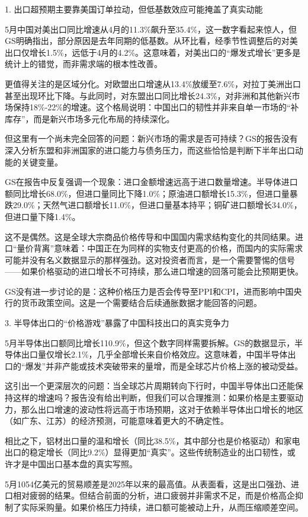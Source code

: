 \documentclass[11pt]{ctexart}
\begin{document}
1. 出口超预期主要靠美国订单拉动，但低基数效应可能掩盖了真实动能

5月中国对美出口同比增速从4月的11.3\%飙升至35.4\%，这一数字看起来惊人，但GS明确指出，部分原因是去年同期的低基数。从环比看，经季节性调整后的对美出口仅增长1.5\%，远低于4月的4.2\%。这意味着，对美出口的“爆发式增长”更多是统计上的错觉，而非需求端的根本性改善。

更值得关注的是区域分化。对欧盟出口增速从13.4\%放缓至7.6\%，对拉丁美洲出口甚至出现环比下降。与此同时，对东盟出口同比增长24.3\%，对非洲和其他新兴市场保持18\%-22\%的增速。这个格局说明：中国出口的韧性并非来自单一市场的“补库存”，而是新兴市场多元化布局的持续深化。

但这里有一个尚未完全回答的问题：新兴市场的需求是否可持续？GS的报告没有深入分析东盟和非洲国家的进口能力与债务压力，而这些恰恰是判断下半年出口动能的关键变量。

GS在报告中反复强调一个现象：进口金额增速远高于进口数量增速。半导体进口额同比增长68.0\%，但进口量同比下降1.0\%；原油进口额增长15.3\%，但进口量暴跌29.0\%；天然气进口额增长11.0\%，但进口量基本持平；铜矿进口额增长34.0\%，但进口量下降1.4\%。

这不是偶然。这是全球大宗商品价格传导和中国国内需求结构变化的共同结果。进口“量价背离”意味着：中国正在为同样的实物支付更高的价格，而国内的实际需求可能并没有名义数据显示的那样强劲。这对投资者而言，是一个需要警惕的信号——如果价格驱动的进口增长不可持续，那么进口增速的回落可能会比预期更快。

GS没有进一步讨论的是：这种价格压力是否会传导至PPI和CPI，进而影响中国央行的货币政策空间。这是一个需要结合后续通胀数据才能回答的问题。

3. 半导体出口的“价格游戏”暴露了中国科技出口的真实竞争力

5月半导体出口额同比增长110.9\%，但这个数字同样需要拆解。GS的数据显示，半导体出口量仅增长2.1\%，几乎全部增长来自价格效应。这意味着，中国半导体出口的“爆发”并非产能或技术突破带来的量增，而是全球芯片价格上涨的被动受益。

这引出一个更深层次的问题：当全球芯片周期转向下行时，中国半导体出口还能保持这样的增速吗？报告没有给出判断，但我们可以合理推测：如果价格是主要驱动力，那么出口增速的波动性将远高于市场预期，这对于依赖半导体出口增长的地区（如广东、江苏）的经济预测，可能意味着更大的不确定性。

相比之下，铝材出口量的温和增长（同比38.5\%，其中部分也是价格驱动）和家电出口的稳定增长（同比9.2\%）显得更加“真实”。这些传统制造业的出口韧性，或许才是中国出口基本盘的真实写照。

5月1054亿美元的贸易顺差是2025年以来的最高值。从表面看，这是出口强劲、进口相对疲弱的结果。但结合前面的分析，进口疲弱并非需求不足，而是价格高企抑制了实际采购量。如果价格压力持续，进口额可能被动上升，从而压缩顺差空间。
\end{document}
